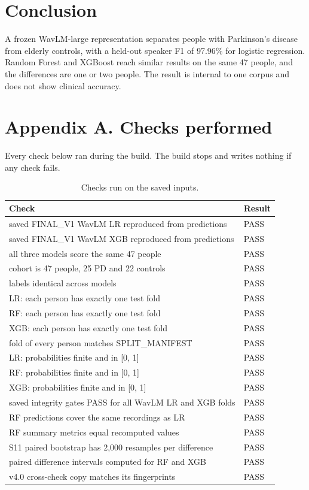 \documentclass[11pt,a4paper]{article}
\begin{document}
\section{Conclusion}\label{sec:conclusion}
A frozen WavLM-large representation separates people with Parkinson's disease from elderly controls, with a held-out speaker F1 of 97.96\% for logistic regression. Random Forest and XGBoost reach similar results on the same 47 people, and the differences are one or two people. The result is internal to one corpus and does not show clinical accuracy.

\section*{Appendix A. Checks performed}
Every check below ran during the build. The build stops and writes nothing if any check fails.

\begin{table}[H]\centering\footnotesize\renewcommand{\arraystretch}{1.15}
\caption{Checks run on the saved inputs.}
\begin{tabular}{p{12.5cm}l}
\toprule
\textbf{Check} & \textbf{Result}\\
\midrule
saved FINAL\_V1 WavLM LR reproduced from predictions & PASS\\
saved FINAL\_V1 WavLM XGB reproduced from predictions & PASS\\
all three models score the same 47 people & PASS\\
cohort is 47 people, 25 PD and 22 controls & PASS\\
labels identical across models & PASS\\
LR: each person has exactly one test fold & PASS\\
RF: each person has exactly one test fold & PASS\\
XGB: each person has exactly one test fold & PASS\\
fold of every person matches SPLIT\_MANIFEST & PASS\\
LR: probabilities finite and in [0, 1] & PASS\\
RF: probabilities finite and in [0, 1] & PASS\\
XGB: probabilities finite and in [0, 1] & PASS\\
saved integrity gates PASS for all WavLM LR and XGB folds & PASS\\
RF predictions cover the same recordings as LR & PASS\\
RF summary metrics equal recomputed values & PASS\\
S11 paired bootstrap has 2,000 resamples per difference & PASS\\
paired difference intervals computed for RF and XGB & PASS\\
v4.0 cross-check copy matches its fingerprints & PASS\\
\bottomrule
\end{tabular}\end{table}
\end{document}
